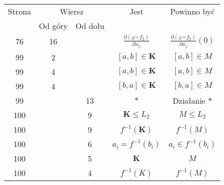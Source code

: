 \documentclass[a4paper,11pt]{article}
\begin{document}
\begin{center}
  \newpage

  \begin{tabular}{|c|c|c|c|c|}
    \hline
    Strona & \multicolumn{2}{c|}{Wiersz} & Jest
                              & Powinno być \\ \cline{2-3}
    & Od góry & Od dołu & & \\
    \hline
    76  & 16 & & $\displaystyle \frac{ \partial ( \varphi \circ f_{ 2 } ) }{ \partial x_{ j } }$
           & $\displaystyle \frac{ \partial ( \varphi \circ f_{ 2 } ) }{ \partial x_{ j } }( 0 )$ \\
    99  &  2 & & $[ a, b ] \in \mathbf{K}$ & $[ a, b ] \in M$ \\
    99  &  4 & & $[ a, b ] \in \mathbf{K}$ & $[ a, b ] \in M$ \\
    99  &  4 & & $[ b, a ] \in \mathbf{K}$ & $[ b, a ] \in M$ \\
    99  & & 13 & $*$ & Działanie $*$ \\
    100 & &  9 & $\mathbf{K} \leq L_{ 2 }$ & $M \leq L_{ 2 }$ \\
    100 & &  9 & $f^{ -1 }( \mathbf{K} )$ & $f^{ - 1}( M )$ \\
    100 & &  6 & $a_{ i } = f^{ -1 }( b_{ i } )$
           & $a_{ i } \in f^{ -1 }( b_{ i } )$ \\
    100 & &  5 & $\mathbf{K}$ & $M$ \\
    100 & &  4 & $f^{ -1 }( K )$ & $f^{ -1 }( M )$ \\
    \hline
  \end{tabular}

\end{center}

\vspace{\spaceTwo}
\end{document}
